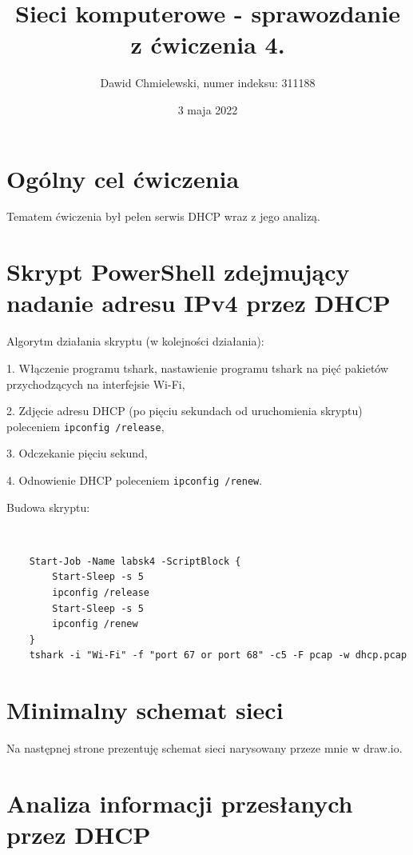 \documentclass[a4paper,11pt]{article}
\begin{document}
\title{ Sieci komputerowe - sprawozdanie z ćwiczenia 4. }
\author{ Dawid Chmielewski, numer indeksu: 311188 }
\date{3 maja 2022}


\section{Ogólny cel ćwiczenia}

Tematem ćwiczenia był pełen serwis DHCP wraz z jego analizą.

\section{Skrypt PowerShell zdejmujący nadanie adresu IPv4 przez DHCP}

Algorytm działania skryptu (w kolejności działania):

1. Włączenie programu tshark, nastawienie programu tshark na pięć pakietów przychodzących na interfejsie Wi-Fi,

2. Zdjęcie adresu DHCP (po pięciu sekundach od uruchomienia skryptu) poleceniem {\tt ipconfig /release},

3. Odczekanie pięciu sekund,

4. Odnowienie DHCP poleceniem {\tt ipconfig /renew}.

Budowa skryptu:


{\tt
\begin{verbatim}
    Start-Job -Name labsk4 -ScriptBlock {
	    Start-Sleep -s 5
	    ipconfig /release
	    Start-Sleep -s 5
	    ipconfig /renew
    }
    tshark -i "Wi-Fi" -f "port 67 or port 68" -c5 -F pcap -w dhcp.pcap
\end{verbatim}
}


\section{Minimalny schemat sieci}

Na następnej strone prezentuję schemat sieci narysowany przeze mnie w draw.io.

\pagebreak


\section{Analiza informacji przesłanych przez DHCP}
\end{document}
